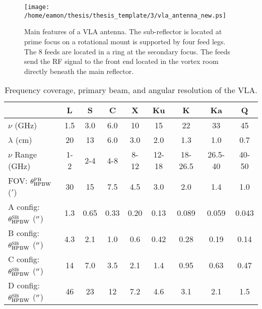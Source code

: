 \begin{figure}[hbt!]
\centering 
          \texttt{[image: /home/eamon/thesis/thesis\_template/3/vla\_antenna\_new.ps]}
\caption[Main features of a VLA antenna.]{Main features of a VLA antenna. The sub-reflector is located at prime focus on a rotational mount is supported by four feed legs. The 8 feeds are located in a ring at the secondary focus. The feeds send the RF signal to the front end located in the vortex room directly beneath the main reflector.}
\label{fig3.1}
\end{figure}

\begin{table}
\begin{center}
\caption[Frequency coverage, primary beam, and angular resolution of the VLA.]
{Frequency coverage, primary beam, and angular resolution of the VLA.}
\begin{tabular}{lcccccccc}
\hline
\hline
\rule{0pt}{2.5ex} &  L& S&C&X&Ku&K&Ka&Q\\
\hline
\rule{0pt}{2.5ex}$\nu$ (GHz)& 1.5& 3.0&6.0&10&15&22&33&45\\
$\lambda$ (cm)& 20& 13&6.0&3.0&2.0&1.3&1.0&0.7\\
$\nu$ Range (GHz)& 1-2& 2-4&4-8&8-12&12-18&18-26.5&26.5-40&40-50\\
FOV: $\theta_{\rm{HPBW}} ^{\rm{PB}}$ ($'$)& 30& 15&7.5 &4.5 &3.0&2.0&1.4&1.0\\
A config: $\theta_{\rm{HPBW}}^{\rm{SB}}$ ($^{\prime\prime}$)&  1.3& 0.65&0.33&0.20&0.13&0.089&0.059&0.043\\
B config: $\theta_{\rm{HPBW}}^{\rm{SB}}$ ($^{\prime\prime}$)&  4.3& 2.1&1.0&0.6&0.42&0.28&0.19&0.14\\
C config: $\theta_{\rm{HPBW}}^{\rm{SB}}$ ($^{\prime\prime}$)&  14& 7.0&3.5&2.1&1.4&0.95&0.63&0.47\\
D config: $\theta_{\rm{HPBW}}^{\rm{SB}}$ ($^{\prime\prime}$)&  46& 23&12&7.2&4.6&3.1&2.1&1.5\\
\hline
\end{tabular}
\label{tab:3.1}
\end{center}
\end{table}
